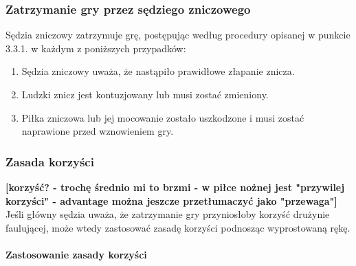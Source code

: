 \documentclass[12pt]{article}
\begin{document}
\subsubsection{Zatrzymanie gry przez sędziego zniczowego}

Sędzia zniczowy zatrzymuje grę, postępując według procedury opisanej w
punkcie 3.3.1. w każdym z poniższych przypadków:

\begin{enumerate}
\item
    Sędzia zniczowy uważa, że nastąpiło prawidłowe złapanie znicza.
  \item
    Ludzki znicz jest kontuzjowany lub musi zostać zmieniony.
  \item
    Piłka zniczowa lub jej mocowanie zostało uszkodzone i musi zostać
  naprawione przed wznowieniem gry.
  \end{enumerate}

\subsubsection{Zasada korzyści}
\textbf{[korzyść? - trochę średnio mi to brzmi - w piłce nożnej jest "przywilej korzyści" - advantage można jeszcze przetłumaczyć jako "przewaga"]}
Jeśli główny sędzia uważa, że zatrzymanie gry przyniosłoby korzyść
drużynie faulującej, może wtedy zastosować zasadę korzyści podnosząc
wyprostowaną rękę.

\paragraph{Zastosowanie zasady korzyści}
\end{document}
